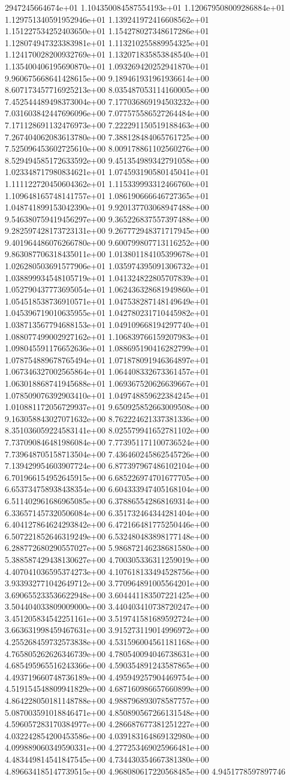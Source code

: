 2947245664674e+01	1.104350084587554193e+01	1.120679508009286884e+01	1.129751340591952946e+01	1.139241972416608562e+01	1.151227534252403650e+01	1.154278027348617286e+01	1.128074947323383981e+01	1.113210255889954325e+01	1.124170028200932769e+01	1.132071835853848540e+01	1.135400406195690870e+01	1.093269420252941870e+01	9.960675668641428615e+00	9.189461931961936614e+00	8.607173457716925213e+00	8.035487053114160005e+00	7.452544489498373004e+00	7.177036869194503232e+00	7.031603842447696096e+00	7.077575586527264484e+00	7.171128691132476973e+00	7.222291150519188463e+00	7.267404062083613780e+00	7.388128484065761725e+00	7.525096453602725610e+00	8.009178861102560276e+00	8.529494585172633592e+00	9.451354989342791058e+00	1.023348717980834621e+01	1.074593190580145041e+01	1.111122720450604362e+01	1.115339993312466760e+01	1.109648165748141757e+01	1.086190666646727365e+01	1.048741899153042390e+01	9.920137703068947488e+00	9.546380759419456297e+00	9.365226837557397488e+00	9.282597428173723131e+00	9.267772948371717945e+00	9.401964486076266780e+00	9.600799807713116252e+00	9.863087706318435011e+00	1.013801184105399678e+01	1.026280503691577906e+01	1.035974395091306732e+01	1.038899934548105719e+01	1.041324822805707839e+01	1.052790437773695054e+01	1.062436328681949860e+01	1.054518538736910571e+01	1.047538287148149649e+01	1.045396719010635955e+01	1.042780231710445982e+01	1.038713567794688153e+01	1.049109668194297740e+01	1.088077499002927162e+01	1.106839766159207983e+01	1.098045591176652636e+01	1.088695190416282799e+01	1.078754889678765494e+01	1.071878091946364897e+01	1.067346327002565864e+01	1.064408332673361457e+01	1.063018868741945688e+01	1.069367520626639667e+01	1.078509076392903410e+01	1.049748859622384245e+01	1.010881172056729937e+01	9.650925852663009508e+00	9.163058843027071632e+00	8.762224621337381336e+00	8.351036059224583141e+00	8.025579941652781102e+00	7.737090846481986084e+00	7.773951171100736524e+00	7.739648705158713504e+00	7.436460245862545726e+00	7.139429954603907724e+00	6.877397967486102104e+00	6.701966154952645915e+00	6.685226974701677705e+00	6.653734758938438354e+00	6.604333947405168104e+00	6.511402961686965085e+00	6.378865542868169314e+00	6.336571457320506084e+00	6.351732464344281404e+00	6.404127864624293842e+00	6.472166481775250446e+00	6.507221852646319249e+00	6.532480483898177148e+00	6.288772680290557027e+00	5.986872146238681580e+00	5.388587429438130627e+00	4.700305336311259019e+00	4.407041036595374273e+00	4.107618133494528756e+00	3.933932771042649712e+00	3.770964891005564201e+00	3.690655233536622948e+00	3.604441183507221425e+00	3.504404033809009000e+00	3.440403410738720247e+00	3.451205834542251161e+00	3.519741581689592724e+00	3.663631998459467631e+00	3.915273119014996972e+00	4.255268459732573838e+00	4.531596004561181168e+00	4.765805262626346739e+00	4.780540094046738631e+00	4.685495965516243366e+00	4.590354891243587865e+00	4.493719660748736189e+00	4.495949257904469754e+00	4.519154548809941829e+00	4.687160986657660899e+00	4.864228050181148788e+00	4.988796893078587757e+00	5.087003591018846471e+00	4.850890567266131548e+00	4.596057283170384977e+00	4.286687677381251227e+00	4.032242854200453586e+00	4.039183164869132980e+00	4.099889060349590331e+00	4.277253469025966481e+00	4.483449814541847545e+00	4.734430354667381380e+00	4.896634185147739515e+00	4.968080617220568485e+00	4.9451778597897746
